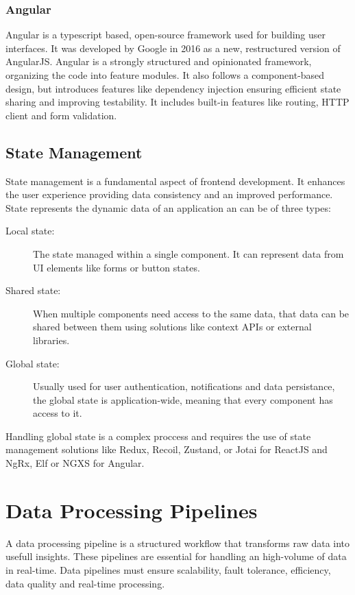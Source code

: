 \subsubsection{Angular}
Angular is a typescript based, open-source framework used for building user
interfaces. It was developed by Google in 2016 as a new, restructured version
of AngularJS. Angular is a strongly structured and opinionated framework,
organizing the code into feature modules. It also follows a component-based
design, but introduces features like dependency injection ensuring efficient
state sharing and improving testability.
It includes built-in features like routing, HTTP client and form validation.

\subsection{State Management}
State management is a fundamental aspect of frontend development. It enhances
the user experience providing data consistency and an improved performance.
State represents the dynamic data of an application an can be of three types:

\begin{description}

	\item[Local state:] The state managed within a single component. It can
	      represent data from UI elements like forms or button states.

	\item[Shared state:] When multiple components need access to the same data,
	      that data can be shared between them using solutions like context APIs or
	      external libraries.

	\item[Global state:] Usually used for user authentication, notifications and
	      data persistance, the global state is application-wide, meaning that
	      every component has access to it.
\end{description}

Handling global state is a complex proccess and requires the use of state
management solutions like Redux, Recoil, Zustand, or Jotai for ReactJS and
NgRx, Elf or NGXS for Angular.

\section{Data Processing Pipelines}
A data processing pipeline is a structured workflow that transforms raw data
into usefull insights. These pipelines are essential for handling an high-volume
of data in real-time. Data pipelines must ensure scalability, fault tolerance,
efficiency, data quality and real-time processing.

